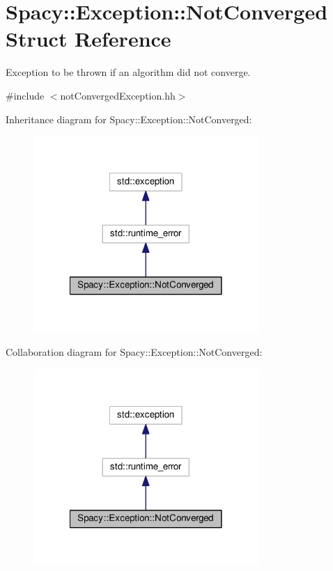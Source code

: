 \hypertarget{structSpacy_1_1Exception_1_1NotConverged}{\section{Spacy\-:\-:Exception\-:\-:Not\-Converged Struct Reference}
\label{structSpacy_1_1Exception_1_1NotConverged}
}


Exception to be thrown if an algorithm did not converge.  




{\ttfamily \#include $<$not\-Converged\-Exception.\-hh$>$}



Inheritance diagram for Spacy\-:\-:Exception\-:\-:Not\-Converged\-:
\nopagebreak
\begin{figure}[H]
\begin{center}
\leavevmode
\includegraphics[width=242pt]{structSpacy_1_1Exception_1_1NotConverged__inherit__graph}
\end{center}
\end{figure}


Collaboration diagram for Spacy\-:\-:Exception\-:\-:Not\-Converged\-:
\nopagebreak
\begin{figure}[H]
\begin{center}
\leavevmode
\includegraphics[width=242pt]{structSpacy_1_1Exception_1_1NotConverged__coll__graph}
\end{center}
\end{figure}

